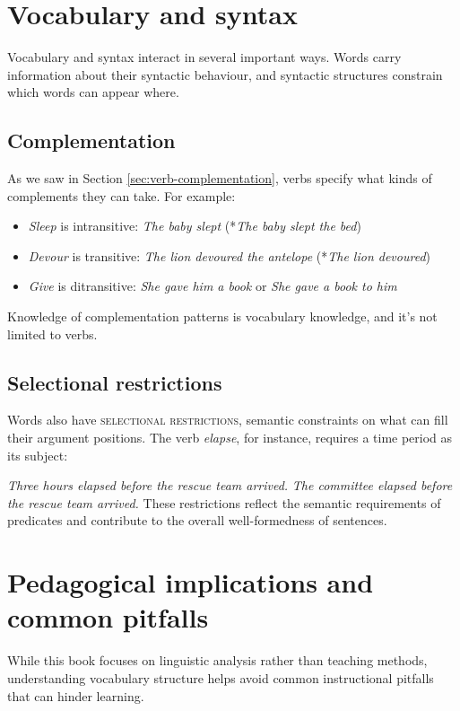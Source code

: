 \section{Vocabulary and syntax} \label{sec:vocab-syntax}

Vocabulary and syntax interact in several important ways. Words carry information about their syntactic behaviour, and syntactic structures constrain which words can appear where.

\subsection{Complementation}\label{ssec:complementation}

As we saw in Section \ref{sec:verb-complementation}, verbs specify what kinds of complements they can take. For example:
\begin{itemize}[noitemsep]
\item \textit{Sleep} is intransitive: \textit{The baby slept} (*\textit{The baby slept the bed})
\item \textit{Devour} is transitive: \textit{The lion devoured the antelope} (*\textit{The lion devoured})
\item \textit{Give} is ditransitive: \textit{She gave him a book} or \textit{She gave a book to him}
\end{itemize}
Knowledge of complementation patterns is vocabulary knowledge, and it's not limited to verbs.

\subsection{Selectional restrictions}

Words also have \textsc{selectional restrictions}, semantic constraints on what can fill their argument positions. The verb \textit{elapse}, for instance, requires a time period as its subject:

\ea
\ea \textit{Three hours elapsed before the rescue team arrived.}
\ex *\textit{The committee elapsed before the rescue team arrived.}
\z\z
These restrictions reflect the semantic requirements of predicates and contribute to the overall well-formedness of sentences.

\section{Pedagogical implications and common pitfalls}

While this book focuses on linguistic analysis rather than teaching methods, understanding vocabulary structure helps avoid common instructional pitfalls that can hinder learning.

